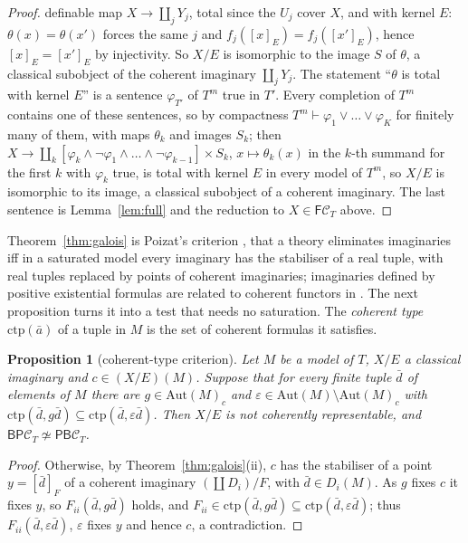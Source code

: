 \documentclass[11pt]{amsart}
\newtheorem{prop}[thm]{Proposition}
\theoremstyle{definition}
\newcommand{\FF}{\mathsf F}
\newcommand{\PP}{\mathsf P}
\newcommand{\BB}{\mathsf B}
\newcommand{\cC}{\mathcal C}
\begin{document}
\begin{proof}
definable map $X\to\coprod_jY_j$, total since the $U_j$ cover $X$, and
with kernel $E$: $\theta(x)=\theta(x')$ forces the same $j$ and
$f_j([x]_E)=f_j([x']_E)$, hence $[x]_E=[x']_E$ by injectivity. So $X/E$
is isomorphic to the image $S$ of $\theta$, a classical subobject of
the coherent imaginary $\coprod_jY_j$. The statement ``$\theta$ is
total with kernel $E$'' is a sentence $\varphi_{T'}$ of $T^m$ true in
$T'$. Every completion of $T^m$ contains one of these sentences, so by
compactness $T^m\vdash\varphi_1\vee\dots\vee\varphi_K$ for finitely many
of them, with maps $\theta_k$ and images $S_k$; then $X\to\coprod_k
[\varphi_k\wedge\neg\varphi_1\wedge\dots\wedge\neg\varphi_{k-1}]\times
S_k$, $x\mapsto\theta_k(x)$ in the $k$-th summand for the first $k$ with
$\varphi_k$ true, is total with kernel $E$ in every model of $T^m$, so
$X/E$ is isomorphic to its image, a classical subobject of a coherent
imaginary. The last sentence is Lemma~\ref{lem:full} and the
reduction to $X\in\FF\cC_T$ above.
\end{proof}

Theorem~\ref{thm:galois} is Poizat's criterion \cite{Poizat83}, that a
theory eliminates imaginaries iff in a saturated model every imaginary
has the stabiliser of a real tuple, with real tuples replaced by points
of coherent imaginaries; imaginaries defined by positive existential
formulas are related to coherent functors in \cite{RP06}. The next proposition turns it into a test
that needs no saturation. The \emph{coherent type} $\mathrm{ctp}(\bar a)$
of a tuple in $M$ is the set of coherent formulas it satisfies.

\begin{prop}[coherent-type criterion]\label{prop:ctp}
Let $M$ be a model of $T$, $X/E$ a classical imaginary and
$c\in(X/E)(M)$. Suppose that for every finite tuple $\bar d$ of elements
of $M$ there are $g\in\mathrm{Aut}(M)_c$ and $\varepsilon\in\mathrm{Aut}(M)
\setminus\mathrm{Aut}(M)_c$ with
$\mathrm{ctp}(\bar d,g\bar d)\subseteq\mathrm{ctp}(\bar d,\varepsilon\bar
d)$. Then $X/E$ is not coherently representable, and $\BB\PP\cC_T
\not\simeq\PP\BB\cC_T$.
\end{prop}
\begin{proof}
Otherwise, by Theorem~\ref{thm:galois}(ii), $c$ has the stabiliser of a
point $y=[\bar d]_F$ of a coherent imaginary $(\coprod D_i)/F$, with
$\bar d\in D_i(M)$. As $g$ fixes $c$ it fixes $y$, so $F_{ii}(\bar d,
g\bar d)$ holds, and $F_{ii}\in\mathrm{ctp}(\bar d,g\bar d)\subseteq
\mathrm{ctp}(\bar d,\varepsilon\bar d)$; thus $F_{ii}(\bar d,\varepsilon
\bar d)$, $\varepsilon$ fixes $y$ and hence $c$, a contradiction.
\end{proof}
\end{document}
